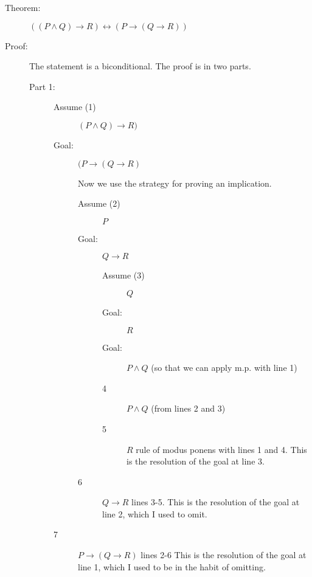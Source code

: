 \documentclass[12pt]{book}
\begin{document}
\begin{description}

\item[Theorem:]  $((P \wedge Q) \rightarrow R) \leftrightarrow (P \rightarrow (Q \rightarrow R))$

\item[Proof:]

The statement is a biconditional.  The proof is in two parts.

\begin{description}

\item[Part 1:]

\begin{description}

\item[Assume (1)]  $(P \wedge Q) \rightarrow R)$

\item[Goal:]  $(P \rightarrow (Q \rightarrow R)$

Now we use the strategy for proving an implication.

\begin{description}

\item[Assume (2)]  $P$

\item[Goal:]  $Q \rightarrow R$

\begin{description}

\item[Assume (3)]  $Q$

\item[Goal:]  $R$

\item[Goal:]  $P \wedge Q$ (so that we can apply m.p. with line 1)

\item[4] $P \wedge Q$ (from lines 2 and 3)

\item[5] $R$ rule of modus ponens with lines 1 and 4.  This is the resolution of the goal at line 3.

\end{description}

\item[6]  $Q \rightarrow R$ lines 3-5.  This is the resolution of the goal at line 2, which I used to omit.

\end{description}

\item[7]  $P \rightarrow (Q \rightarrow R)$  lines 2-6 This is the resolution of the goal at line 1, which I used to be in the habit of omitting.


\end{description}
\end{description}
\end{description}
\end{document}

